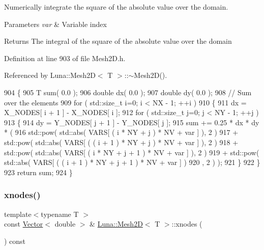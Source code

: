 Numerically integrate the square of the absolute value over the domain. 


\begin{DoxyParams}{Parameters}
{\em var} & Variable index \\
\hline
\end{DoxyParams}
\begin{DoxyReturn}{Returns}
The integral of the square of the absolute value over the domain 
\end{DoxyReturn}


Definition at line 903 of file Mesh2\+D.\+h.



Referenced by Luna\+::\+Mesh2\+D$<$ T $>$\+::$\sim$\+Mesh2\+D().


\begin{DoxyCode}
904   \{
905     T sum( 0.0 );
906     \textcolor{keywordtype}{double} dx( 0.0 );
907     \textcolor{keywordtype}{double} dy( 0.0 );
908     \textcolor{comment}{// Sum over the elements}
909     \textcolor{keywordflow}{for} ( std::size\_t i=0; i < NX - 1; ++i )
910     \{
911       dx = X\_NODES[ i + 1 ] - X\_NODES[ i ];
912       \textcolor{keywordflow}{for} ( std::size\_t j=0; j < NY - 1; ++j )
913       \{
914         dy = Y\_NODES[ j + 1 ] - Y\_NODES[ j ];
915         sum += 0.25 * dx * dy * (
916             std::pow( std::abs( VARS[ ( i * NY + j ) * NV + var ] ), 2 )
917           + std::pow( std::abs( VARS[ ( ( i + 1 ) * NY + j ) * NV + var ] ), 2 )
918           + std::pow( std::abs( VARS[ ( i * NY + j + 1 ) * NV + var ] ), 2 )
919           + std::pow( std::abs( VARS[ ( ( i + 1 ) * NY + j + 1 ) * NV + var ] )
920                                                                         , 2 ) );
921       \}
922     \}
923     \textcolor{keywordflow}{return} sum;
924   \}
\end{DoxyCode}
\mbox{\label{classLuna_1_1Mesh2D_a8a860fec0e116f915dcac68476d9e7d8}} 
\subsubsection{\texorpdfstring{xnodes()}{xnodes()}}
{\footnotesize\ttfamily template$<$typename T $>$ \\
const \hyperlink{classLuna_1_1Vector}{Vector}$<$ double $>$ \& \hyperlink{classLuna_1_1Mesh2D}{Luna\+::\+Mesh2D}$<$ T $>$\+::xnodes (\begin{DoxyParamCaption}{ }\end{DoxyParamCaption}) const}



